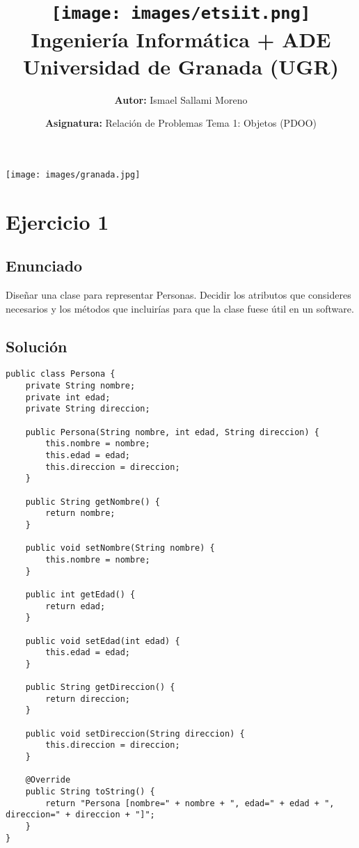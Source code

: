 \documentclass[a4paper,12pt]{article}
\title{
    \vspace{-2cm}
    \texttt{[image: images/etsiit.png]} \\ %
    \LARGE Ingeniería Informática + ADE\\
    \large Universidad de Granada (UGR)\\[1cm]
}
\author{\textbf{Autor:} Ismael Sallami Moreno}
\date{\textbf{Asignatura:} Relación de Problemas Tema 1: Objetos (PDOO)\\[1cm]}
\begin{document}
\maketitle
\thispagestyle{empty}

\begin{center}
    \texttt{[image: images/granada.jpg]} \\ %
    \vfill
\end{center}

\newpage

\tableofcontents
\newpage


\section{Ejercicio 1}

\subsection{Enunciado}
Diseñar una clase para representar Personas. Decidir los atributos que consideres necesarios y los métodos que incluirías para que la clase fuese útil en un software.

\subsection{Solución}

\begin{lstlisting}[style=customjava]
public class Persona {
    private String nombre;
    private int edad;
    private String direccion;

    public Persona(String nombre, int edad, String direccion) {
        this.nombre = nombre;
        this.edad = edad;
        this.direccion = direccion;
    }

    public String getNombre() {
        return nombre;
    }

    public void setNombre(String nombre) {
        this.nombre = nombre;
    }

    public int getEdad() {
        return edad;
    }

    public void setEdad(int edad) {
        this.edad = edad;
    }

    public String getDireccion() {
        return direccion;
    }

    public void setDireccion(String direccion) {
        this.direccion = direccion;
    }

    @Override
    public String toString() {
        return "Persona [nombre=" + nombre + ", edad=" + edad + ", direccion=" + direccion + "]";
    }
}
\end{lstlisting}
\end{document}
